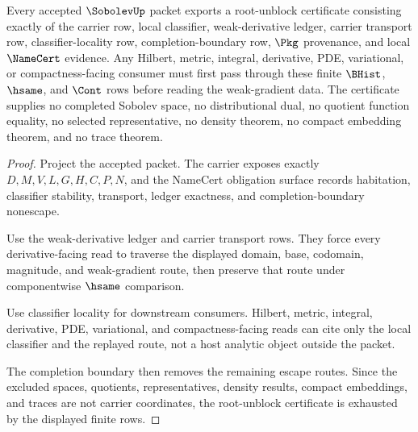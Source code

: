 \begin{theorem}
\label{thm:sobolev-root-unblock-certificate}
Every accepted $\SobolevUp$ packet exports a root-unblock certificate consisting exactly of the carrier row, local classifier, weak-derivative ledger, carrier transport row, classifier-locality row, completion-boundary row, $\Pkg$ provenance, and local $\NameCert$ evidence. Any Hilbert, metric, integral, derivative, PDE, variational, or compactness-facing consumer must first pass through these finite $\BHist$, $\hsame$, and $\Cont$ rows before reading the weak-gradient data. The certificate supplies no completed Sobolev space, no distributional dual, no quotient function equality, no selected representative, no density theorem, no compact embedding theorem, and no trace theorem.
\end{theorem}
\begin{proof}
Project the accepted packet. The carrier exposes exactly $D,M,V,L,G,H,C,P,N$, and the NameCert obligation surface records habitation, classifier stability, transport, ledger exactness, and completion-boundary nonescape.

Use the weak-derivative ledger and carrier transport rows. They force every derivative-facing read to traverse the displayed domain, base, codomain, magnitude, and weak-gradient route, then preserve that route under componentwise $\hsame$ comparison.

Use classifier locality for downstream consumers. Hilbert, metric, integral, derivative, PDE, variational, and compactness-facing reads can cite only the local classifier and the replayed route, not a host analytic object outside the packet.

The completion boundary then removes the remaining escape routes. Since the excluded spaces, quotients, representatives, density results, compact embeddings, and traces are not carrier coordinates, the root-unblock certificate is exhausted by the displayed finite rows.
\end{proof}

